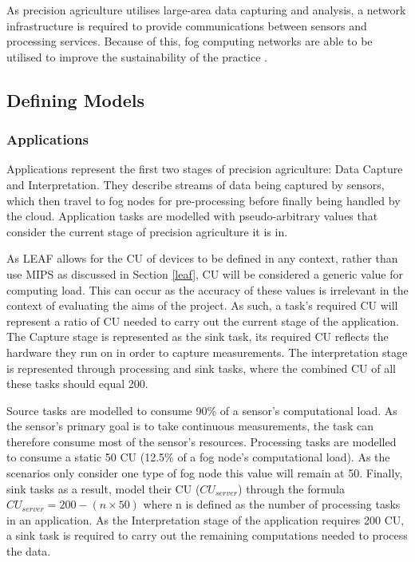 \documentclass{l4proj}
\begin{document}
As precision agriculture utilises large-area data capturing and analysis, a network infrastructure is required to provide communications between sensors and processing services.
Because of this, fog computing networks are able to be utilised to improve the sustainability of the practice \citep{fog_smart_farming}.

\subsection{Defining Models}\label{eval:subsec:modelling}

\subsubsection{Applications}
Applications represent the first two stages of precision agriculture: Data Capture and Interpretation.
They describe streams of data being captured by sensors, which then travel to fog nodes for pre-processing before finally being handled by the cloud.
Application tasks are modelled with pseudo-arbitrary values that consider the current stage of precision agriculture it is in.

As LEAF allows for the CU of devices to be defined in any context, rather than use MIPS as discussed in Section \ref{leaf}, CU will be considered a generic value for computing load.
This can occur as the accuracy of these values is irrelevant in the context of evaluating the aims of the project.
As such, a task's required CU will represent a ratio of CU needed to carry out the current stage of the application.
The Capture stage is represented as the sink task, its required CU reflects the hardware they run on in order to capture measurements.
The interpretation stage is represented through processing and sink tasks, where the combined CU of all these tasks should equal 200.

Source tasks are modelled to consume 90\% of a sensor's computational load.
As the sensor's primary goal is to take continuous measurements, the task can therefore consume most of the sensor's resources.
Processing tasks are modelled to consume a static 50 CU (12.5\% of a fog node's computational load).
As the scenarios only consider one type of fog node this value will remain at 50.
Finally, sink tasks as a result, model their CU ($CU_{server}$) through the formula $CU_{server} = 200 - (n \times 50)$ where n is defined as the number of processing tasks in an application.
As the Interpretation stage of the application requires 200 CU, a sink task is required to carry out the remaining computations needed to process the data.
\end{document}

